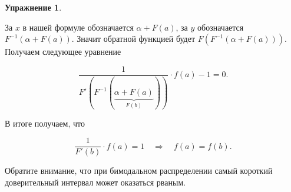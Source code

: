 \documentclass[12pt, a4paper, oneside]{extreport}
\theoremstyle{plain}              %
\theoremstyle{definition}         %
\newtheorem{problem}{\color{myblue} Упражнение}
\begin{document}
\begin{problem}
\begin{sol}
За $x$ в нашей формуле обозначается $\alpha + F(a)$, за $y$ обозначается $F^{-1}(\alpha + F(a))$. Значит обратной функцией будет $F(F^{-1}(\alpha + F(a)))$. Получаем следующее уравнение

\[ \frac{1}{F'(F^{-1}(\underbrace{\alpha + F(a)}_{F(b)}))} \cdot f(a) - 1 = 0.\]

В итоге получаем, что 

\[\frac{1}{F'(b)} \cdot f(a) = 1 \quad \Rightarrow \quad f(a) = f(b).\]

Обратите внимание, что при бимодальном распределении самый короткий доверительный интервал может оказаться рваным. 

\end{sol}
\end{problem}


%
\end{document}
